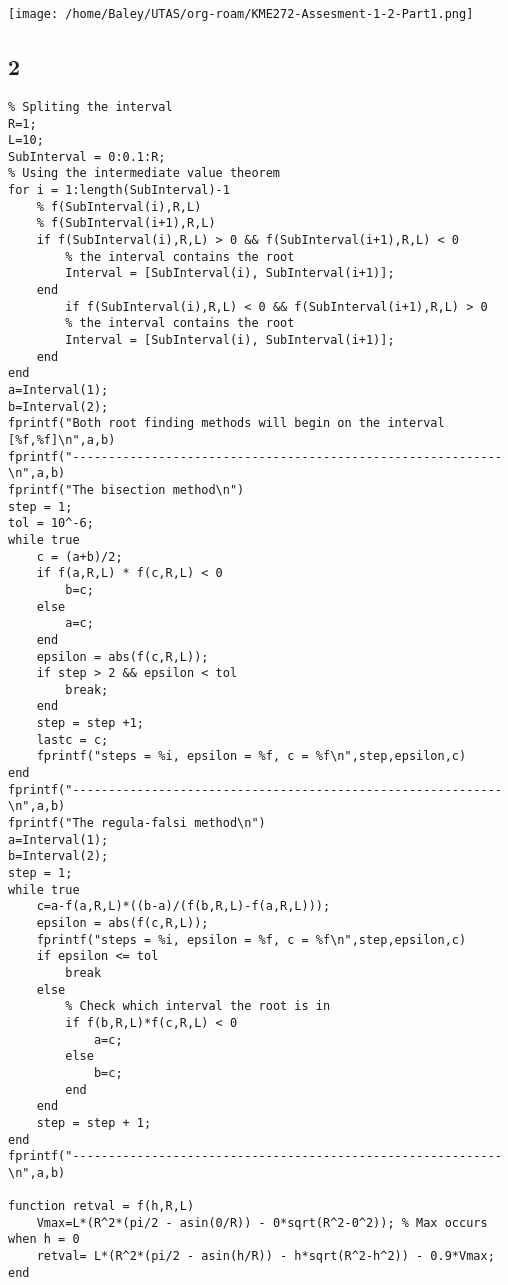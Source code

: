 \documentclass[11pt]{article}
\begin{document}
\begin{center}
\texttt{[image: /home/Baley/UTAS/org-roam/KME272-Assesment-1-2-Part1.png]}
\end{center}
\subsection{2}
\label{sec:orgcbe3e70}
\begin{verbatim}
% Spliting the interval
R=1;
L=10;
SubInterval = 0:0.1:R;
% Using the intermediate value theorem
for i = 1:length(SubInterval)-1
    % f(SubInterval(i),R,L)
    % f(SubInterval(i+1),R,L)
    if f(SubInterval(i),R,L) > 0 && f(SubInterval(i+1),R,L) < 0
        % the interval contains the root
        Interval = [SubInterval(i), SubInterval(i+1)];
    end
        if f(SubInterval(i),R,L) < 0 && f(SubInterval(i+1),R,L) > 0
        % the interval contains the root
        Interval = [SubInterval(i), SubInterval(i+1)];
    end
end
a=Interval(1);
b=Interval(2);
fprintf("Both root finding methods will begin on the interval [%f,%f]\n",a,b)
fprintf("------------------------------------------------------------\n",a,b)
fprintf("The bisection method\n")
step = 1;
tol = 10^-6;
while true
    c = (a+b)/2;
    if f(a,R,L) * f(c,R,L) < 0
        b=c;
    else
        a=c;
    end
    epsilon = abs(f(c,R,L));
    if step > 2 && epsilon < tol
        break;
    end
    step = step +1;
    lastc = c;
    fprintf("steps = %i, epsilon = %f, c = %f\n",step,epsilon,c)
end
fprintf("------------------------------------------------------------\n",a,b)
fprintf("The regula-falsi method\n")
a=Interval(1);
b=Interval(2);
step = 1;
while true
    c=a-f(a,R,L)*((b-a)/(f(b,R,L)-f(a,R,L)));
    epsilon = abs(f(c,R,L));
    fprintf("steps = %i, epsilon = %f, c = %f\n",step,epsilon,c)
    if epsilon <= tol
        break
    else
        % Check which interval the root is in
        if f(b,R,L)*f(c,R,L) < 0
            a=c;
        else
            b=c;
        end
    end
    step = step + 1;
end
fprintf("------------------------------------------------------------\n",a,b)

function retval = f(h,R,L)
    Vmax=L*(R^2*(pi/2 - asin(0/R)) - 0*sqrt(R^2-0^2)); % Max occurs when h = 0
    retval= L*(R^2*(pi/2 - asin(h/R)) - h*sqrt(R^2-h^2)) - 0.9*Vmax;
end
\end{verbatim}
\end{document}
